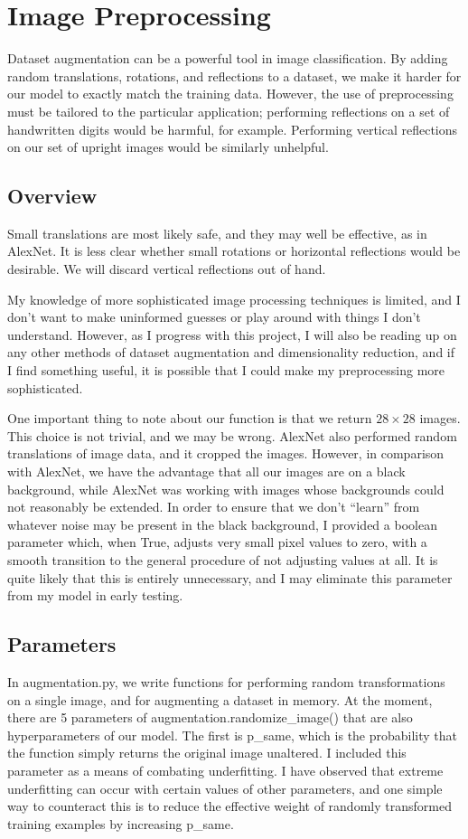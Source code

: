 \section{Image Preprocessing}
Dataset augmentation can be a powerful tool in image classification. By adding random translations, rotations, and reflections to a dataset, we make it harder for our model to exactly match the training data. However, the use of preprocessing must be tailored to the particular application; performing reflections on a set of handwritten digits would be harmful, for example. Performing vertical reflections on our set of upright images would be similarly unhelpful.
\subsection{Overview}
Small translations are most likely safe, and they may well be effective, as in AlexNet. It is less clear whether small rotations or horizontal reflections would be desirable. We will discard vertical reflections out of hand.

My knowledge of more sophisticated image processing techniques is limited, and I don't want to make uninformed guesses or play around with things I don't understand. However, as I progress with this project, I will also be reading up on any other methods of dataset augmentation and dimensionality reduction, and if I find something useful, it is possible that I could make my preprocessing more sophisticated.

One important thing to note about our function is that we return $28\times 28$ images. This choice is not trivial, and we may be wrong. AlexNet also performed random translations of image data, and it cropped the images. However, in comparison with AlexNet, we have the advantage that all our images are on a black background, while AlexNet was working with images whose backgrounds could not reasonably be extended. In order to ensure that we don't ``learn'' from whatever noise may be present in the black background, I provided a boolean parameter which, when {\ttfamily True}, adjusts very small pixel values to zero, with a smooth transition to the general procedure of not adjusting values at all. It is quite likely that this is entirely unnecessary, and I may eliminate this parameter from my model in early testing.
\subsection{Parameters} \label{imageprocessingparams}
In {\ttfamily augmentation.py}, we write functions for performing random transformations on a single image, and for augmenting a dataset in memory. At the moment, there are 5 parameters of {\ttfamily augmentation.randomize\_image()} that are also hyperparameters of our model. The first is {\ttfamily p\_same}, which is the probability that the function simply returns the original image unaltered. I included this parameter as a means of combating underfitting. I have observed that extreme underfitting can occur with certain values of other parameters, and one simple way to counteract this is to reduce the effective weight of randomly transformed training examples by increasing {\ttfamily p\_same}.

